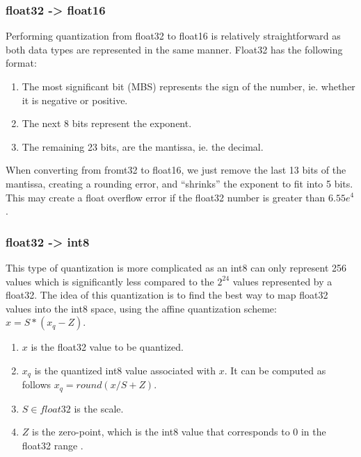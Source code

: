 \documentclass[licencjacka,en]{pracamgr}
\begin{document}
\subsubsection{float32 -> float16}
Performing quantization from float32 to float16 is relatively straightforward as both data types are represented in the same manner. Float32 has the following format:
\begin{enumerate}
	\item The most significant bit (MBS) represents the sign of the number, ie. whether it is negative or positive.
	\item The next 8 bits represent the exponent.
	\item The remaining 23 bits, are the mantissa, ie. the decimal.
\end{enumerate}

When converting from fromt32 to float16, we just remove the last 13 bits of the mantissa, creating a rounding error, and “shrinks” the exponent to fit into 5 bits. This may create a float overflow error if the float32 number is greater than $ 6.55e^4$ \cite{quant_explained}.


\subsubsection{float32 -> int8}
This type of quantization is more complicated as an int8 can only represent 256 values which is significantly less compared to the $ 2^24 $  values represented by a float32. The idea of this quantization is to find the best way to map float32 values into the int8 space, using the affine quantization scheme: $ x = S * (x_q - Z) $.
\begin{enumerate}
	\item $ x $ is the float32 value to be quantized.
	\item  $ x_q $ is the quantized int8 value associated with $ x $. It can be computed as follows $ x_q = round(x/S + Z) $.
	\item $ S \in float32$ is the scale.
	\item $ Z $ is the zero-point, which is the int8 value that corresponds to 0 in the float32 range \cite{quant_hf}.
\end{enumerate}
\end{document}
